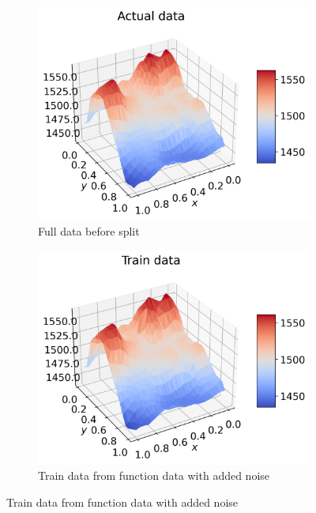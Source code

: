 \documentclass[12pt]{article}
\begin{document}
\begin{figure}[H]
  \begin{subfigure}{.5\textwidth}
    \centering
    \includegraphics[width=\textwidth]{../figures/actual_data_n40_skip2.png}
    \caption{Full data before split}
    \label{fig:real_pred_real_skip}
  \end{subfigure}
  \begin{subfigure}{.5\textwidth}
    \centering
    \includegraphics[width=\textwidth]{../figures/train_data_n40_skip2.png}
    \caption{Train data from function data with added noise}
    \label{fig:real_pred_train_skip}
  \end{subfigure}

\end{figure}
\end{document}
